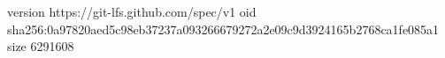 version https://git-lfs.github.com/spec/v1
oid sha256:0a97820aed5c98eb37237a093266679272a2e09c9d3924165b2768ca1fe085a1
size 6291608
